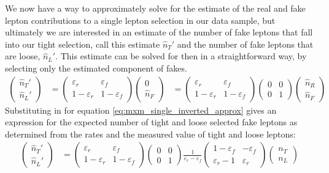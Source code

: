 We now have a way to approximately solve for the estimate
of the real and fake lepton contributions to a single lepton 
selection in our data sample, but ultimately we are interested
in an estimate of 
the number of fake leptons that fall into our tight selection, call this
estimate $\hat{n}_{T}'$ and the number of fake leptons
that are loose, $\hat{n}_{L}'$. 
This estimate can be solved for then in a straightforward way, by 
selecting only the estimated component of fakes.
\begin{align}
  \begin{pmatrix} \hat{n}_T' \\ \hat{n}_L' \end{pmatrix} 
  &= 
  \begin{pmatrix}
  \varepsilon_r & \varepsilon_f \\ 1-\varepsilon_r & 1-\varepsilon_f
  \end{pmatrix} 
  \begin{pmatrix} 0\\ \hat{n}_F \end{pmatrix}
  &=
  \begin{pmatrix}
  \varepsilon_r & \varepsilon_f \\ 1-\varepsilon_r & 1-\varepsilon_f
  \end{pmatrix} 
  \begin{pmatrix}
  0 & 0\\ 0 & 1
  \end{pmatrix} 
  \begin{pmatrix} \hat{n}_R\\ \hat{n}_F \end{pmatrix}
\end{align}
Substituting in for equation \eqn\eqref{eq:mxm_single_inverted_approx}
gives an expression for the expected number of tight and loose
selected fake leptons as determined from the rates and the measured
value of tight and loose leptons:
\begin{align}
  \begin{pmatrix} \hat{n}_T' \\ \hat{n}_L' \end{pmatrix} 
  &=
  \begin{pmatrix}
  \varepsilon_r & \varepsilon_f \\ 1-\varepsilon_r & 1-\varepsilon_f
  \end{pmatrix} 
  \begin{pmatrix}
  0 & 0\\ 0 & 1
  \end{pmatrix} 
  \frac{1}{\varepsilon_r-\varepsilon_f}
  \begin{pmatrix}
  1-\varepsilon_f & -\varepsilon_f \\ \varepsilon_r-1 & \varepsilon_r	
  \end{pmatrix} 
  \begin{pmatrix} n_T\\ n_L \end{pmatrix}
\end{align}
